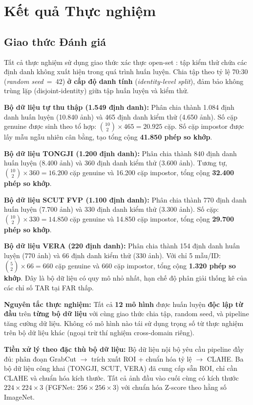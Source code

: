 \documentclass[12pt,a4paper]{article}
\begin{document}
\section{Kết quả Thực nghiệm}

\subsection{Giao thức Đánh giá}

Tất cả thực nghiệm sử dụng giao thức xác thực open-set \cite{b13}: tập kiểm thử chứa các định danh không xuất hiện trong quá trình huấn luyện. Chia tập theo tỷ lệ 70:30 (\textit{random seed}~=~42) \textbf{ở cấp độ danh tính} (\textit{identity-level split}), đảm bảo không trùng lặp (disjoint-identity) giữa tập huấn luyện và kiểm thử.

\textbf{Bộ dữ liệu tự thu thập (1.549 định danh):} Phân chia thành 1.084 định danh huấn luyện (10.840 ảnh) và 465 định danh kiểm thử (4.650 ảnh). Số cặp genuine được sinh theo tổ hợp: $\binom{10}{2} \times 465 = 20.925$ cặp. Số cặp impostor được lấy mẫu ngẫu nhiên cân bằng, tạo tổng cộng \textbf{41.850 phép so khớp}.

\textbf{Bộ dữ liệu TONGJI (1.200 định danh):} Phân chia thành 840 định danh huấn luyện (8.400 ảnh) và 360 định danh kiểm thử (3.600 ảnh). Tương tự, $\binom{10}{2} \times 360 = 16.200$ cặp genuine và 16.200 cặp impostor, tổng cộng \textbf{32.400 phép so khớp}.

\textbf{Bộ dữ liệu SCUT FVP (1.100 định danh):} Phân chia thành 770 định danh huấn luyện (7.700 ảnh) và 330 định danh kiểm thử (3.300 ảnh). Số cặp: $\binom{10}{2} \times 330 = 14.850$ cặp genuine và 14.850 cặp impostor, tổng cộng \textbf{29.700 phép so khớp}.

\textbf{Bộ dữ liệu VERA (220 định danh):} Phân chia thành 154 định danh huấn luyện (770 ảnh) và 66 định danh kiểm thử (330 ảnh). Với chỉ 5 mẫu/ID: $\binom{5}{2} \times 66 = 660$ cặp genuine và 660 cặp impostor, tổng cộng \textbf{1.320 phép so khớp}. Đây là bộ dữ liệu có quy mô nhỏ nhất, hạn chế độ phân giải thống kê của các chỉ số TAR tại FAR thấp.

\textbf{Nguyên tắc thực nghiệm:} Tất cả \textbf{12 mô hình} được huấn luyện \textbf{độc lập từ đầu} trên \textbf{từng bộ dữ liệu} với cùng giao thức chia tập, random seed, và pipeline tăng cường dữ liệu. Không có mô hình nào tái sử dụng trọng số từ thực nghiệm trên bộ dữ liệu khác (ngoại trừ thí nghiệm cross-domain riêng).

\textbf{Tiền xử lý theo đặc thù bộ dữ liệu:} Bộ dữ liệu nội bộ yêu cầu pipeline đầy đủ: phân đoạn GrabCut $\rightarrow$ trích xuất ROI + chuẩn hóa tỷ lệ $\rightarrow$ CLAHE. Ba bộ dữ liệu công khai (TONGJI, SCUT, VERA) đã cung cấp sẵn ROI, chỉ cần CLAHE và chuẩn hóa kích thước. Tất cả ảnh đầu vào cuối cùng có kích thước $224 \times 224 \times 3$ (FGFNet: $256 \times 256 \times 3$) với chuẩn hóa Z-score theo hằng số ImageNet.
\end{document}
